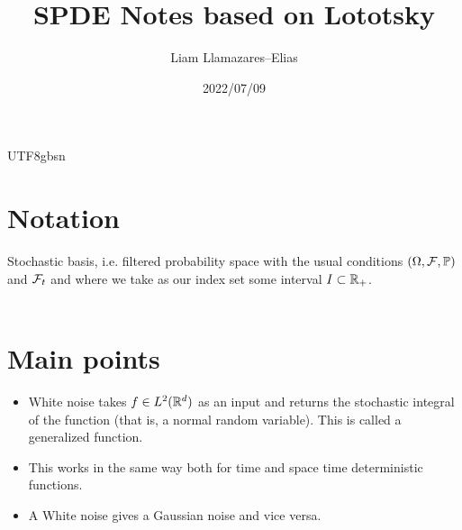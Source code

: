 \documentclass[12pt]{article}
\begin{document}
\begin{CJK*}{UTF8}{gbsn}
	\title{SPDE Notes based on Lototsky}
	\author{Liam Llamazares--Elias}
	\date{2022/07/09}
	\maketitle
	\section{Notation}
	Stochastic basis, i.e. filtered probability space with the usual conditions $(\Omega,\mathcal{F},\mathbb{P})$ and $\mathcal{F}_t$ and where we take as our index set some interval $I\subset {\mathbb R}_+$.\\
	\\
	\section{Main points}
	\begin{itemize}
		\item White noise takes $f\in L^2({\mathbb R}^d)$ as an input  and returns  the stochastic integral of the function (that is, a normal random variable). This is called a generalized function.
		\item This works in the same way both for time and space time deterministic functions.
		\item A White noise gives a Gaussian noise and vice versa.
	\end{itemize}

\end{CJK*}
\end{document}
